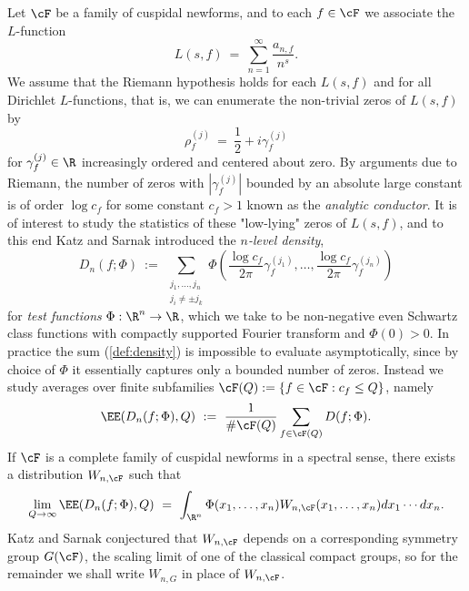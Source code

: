 \documentclass[12pt, reqno]{amsart}
\numberwithin{equation}{section}
\theoremstyle{definition}
\theoremstyle{remark}
\begin{document}
Let $\cF$ be a family of cuspidal newforms, and to each $f \in \cF$ we associate the $L$-function
    \[ L(s, f) \ = \  \sum_{n = 1}^\infty \frac{a_{n, f}}{n^s}. \]
We assume that the Riemann hypothesis holds for each $L(s, f)$ and for all Dirichlet $L$-functions, that is, we can enumerate the non-trivial zeros of $L(s, f)$ by
    \[ \rho^{(j)}_f \ = \  \frac12 + i \gamma_f^{(j)} \]
for $\gamma_f^{(j)} \in \R$ increasingly ordered and centered about zero. By arguments due to Riemann, the number of zeros with $|\gamma_f^{(j)}|$ bounded by an absolute large constant is of order $\log c_f$ for some constant $c_f > 1$ known as the \emph{analytic conductor}. It is of interest to study the statistics of these "low-lying" zeros of $L(s, f)$, and to this end Katz and Sarnak \cite{KatzSarnak} introduced the \emph{$n$-level density},
\begin{equation}
    D_n (f; \Phi) \ := \  \sum_{\substack{j_1, \dots, j_n \\ j_i \neq \pm j_k}} \Phi \left( \frac{\log c_f}{2\pi} \gamma_f^{(j_1)}, \dots, \frac{\log c_f}{2\pi} \gamma_f^{(j_n)} \right)	\label{def:density}
\end{equation}
for \emph{test functions} $\Phi: \R^n \to \R$, which we take to be non-negative even Schwartz class functions with compactly supported Fourier transform and $\Phi(0) > 0$. In practice the sum (\ref{def:density}) is impossible to evaluate asymptotically, since by choice of $\Phi$ it essentially captures only a bounded number of zeros. Instead we study averages over finite subfamilies $\cF (Q) := \{ f \in \cF : c_f \leq Q \}$, namely
\begin{equation}
    \EE (D_n (f; \Phi), Q) \ := \  \frac{1}{\# \cF (Q)} \sum_{f \in \cF (Q)} D(f; \Phi). \label{eq:averages}
\end{equation}
If $\cF$ is a complete family of cuspidal newforms in a spectral sense, there exists a distribution $W_{n, \cF}$ such that
\begin{equation}
    \lim_{Q \to \infty} \EE (D_n (f; \Phi), Q) \ = \   \int_{\R^n} \Phi(x_1, \dots, x_n) W_{n, \cF} (x_1, \dots, x_n) dx_1 \cdots dx_n.
\end{equation}
Katz and Sarnak \cite{KatzSarnak, KatzSarnak2} conjectured that $W_{n, \cF}$ depends on a corresponding symmetry group $G(\cF)$, the scaling limit of one of the classical compact groups, so for the remainder we shall write $W_{n, G}$ in place of $W_{n, \cF}$.
\end{document}
